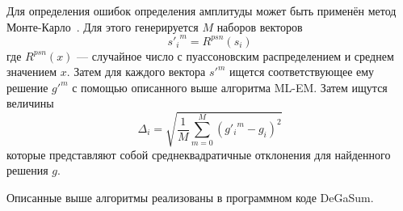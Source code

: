 Для определения ошибок определения амплитуды может быть применён метод Монте-Карло~\cite{Shirk1985}. Для этого генерируется $M$ наборов векторов 
\begin{equation*}
  {{s'}_i}^{m} = R^{psn}(s_i)
\end{equation*}
где $ R^{psn}(x) $ --- случайное число с пуассоновским распределением и среднем значением $x$. Затем для каждого вектора ${s'}^{m}$ ищется соответствующее ему решение ${g'}^{m}$ с помощью описанного выше алгоритма ML-EM. Затем ищутся величины
\begin{equation*}
  \Delta_i = \sqrt{ \frac{1}{M} \sum \limits_{ m = 0 }^{M} \left( {g'_i}^{m} - g_i \right)^2 }
\end{equation*}
которые представляют собой среднеквадратичные отклонения для найденного решения $g$.~\cite{Shevelev2013}

Описанные выше алгоритмы реализованы в программном коде DeGaSum.~\cite{Khilkevitch2013}



